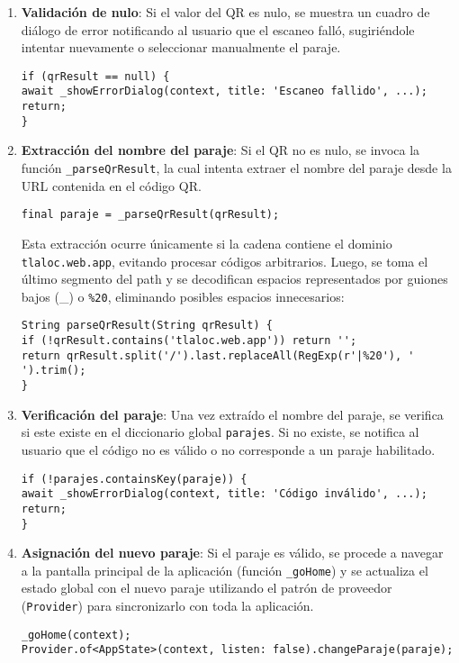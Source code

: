 \begin{enumerate}
\item \textbf{Validación de nulo}: Si el valor del QR es nulo, se muestra un cuadro de diálogo de error notificando al usuario que el escaneo falló, sugiriéndole intentar nuevamente o seleccionar manualmente el paraje.

\begin{verbatim}
if (qrResult == null) {
await _showErrorDialog(context, title: 'Escaneo fallido', ...);
return;
}
\end{verbatim}

\item \textbf{Extracción del nombre del paraje}: Si el QR no es nulo, se invoca la función \texttt{\_parseQrResult}, la cual intenta extraer el nombre del paraje desde la URL contenida en el código QR.

\begin{verbatim}
final paraje = _parseQrResult(qrResult);
\end{verbatim}

Esta extracción ocurre únicamente si la cadena contiene el dominio \texttt{tlaloc.web.app}, evitando procesar códigos arbitrarios. Luego, se toma el último segmento del path y se decodifican espacios representados por guiones bajos (\_) o \texttt{\%20}, eliminando posibles espacios innecesarios:

\begin{verbatim}
String parseQrResult(String qrResult) {
if (!qrResult.contains('tlaloc.web.app')) return '';
return qrResult.split('/').last.replaceAll(RegExp(r'|%20'), ' ').trim();
}
\end{verbatim}

\item \textbf{Verificación del paraje}: Una vez extraído el nombre del paraje, se verifica si este existe en el diccionario global \texttt{parajes}. Si no existe, se notifica al usuario que el código no es válido o no corresponde a un paraje habilitado.

\begin{verbatim}
if (!parajes.containsKey(paraje)) {
await _showErrorDialog(context, title: 'Código inválido', ...);
return;
}
\end{verbatim}

\item \textbf{Asignación del nuevo paraje}: Si el paraje es válido, se procede a navegar a la pantalla principal de la aplicación (función \texttt{\_goHome}) y se actualiza el estado global con el nuevo paraje utilizando el patrón de proveedor (\texttt{Provider}) para sincronizarlo con toda la aplicación.

\begin{verbatim}
_goHome(context);
Provider.of<AppState>(context, listen: false).changeParaje(paraje);
\end{verbatim}
\end{enumerate}

